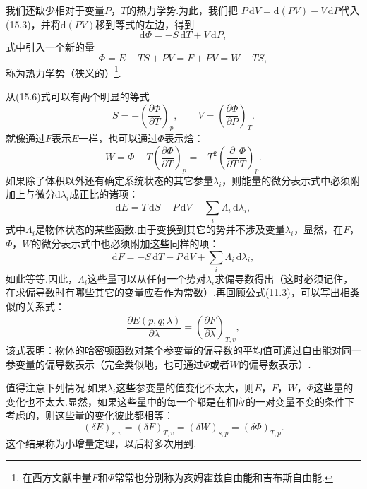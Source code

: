 我们还缺少相对于变量$P$，$T$的热力学势.为此，我们把
$P\,\mathrm{d}V=\mathrm{d}(PV)-V\,\mathrm{d}P$代入(15.3)，并将$\mathrm{d}(PV)$移到等式的左边，得到
\begin{equation}
  \mathrm{d}\varPhi=-S\,\mathrm{d}T+V\,\mathrm{d}P,
\end{equation}
式中引入一个新的量
\begin{equation}
  \varPhi=E-TS+PV=F+PV=W-TS,
\end{equation}
称为热力学势（狭义的）\footnote{在西方文献中量$F$和$\varPhi$常常也分别称为亥姆霍兹自由能和吉布斯自由能.}.

从(15.6)式可以有两个明显的等式
\begin{equation}
  S=-\left(\frac{\partial\varPhi}{\partial T}\right)_p,\qquad
  V=\left(\frac{\partial\varPhi}{\partial P}\right)_T.
\end{equation}
就像通过$F$表示$E$一样，也可以通过$\varPhi$表示焓：
\begin{equation}
  W=\varPhi-T\left(\frac{\partial\varPhi}{\partial T}\right)_p
  =-T^2\left(\frac{\partial}{\partial T}\frac{\varPhi}{T}\right)_p.
\end{equation}
如果除了体积以外还有确定系统状态的其它参量$\lambda_i$，则能量的微分表示式中必须附加上与微分$\mathrm{d}\lambda_i$成正比的诸项：
\begin{equation}
  \mathrm{d}E=T\,\mathrm{d}S-P\,\mathrm{d}V
  +\sum_i\varLambda_i\,\mathrm{d}\lambda_i,
\end{equation}
式中$\varLambda_i$是物体状态的某些函数.由于变换到其它的势并不涉及变量$\lambda_i$，显然，在$F$，$\varPhi$，$W$的微分表示式中也必须附加这些同样的项：
\begin{equation*}
  \mathrm{d}F=-S\,\mathrm{d}T-P\,\mathrm{d}V
  +\sum_i\varLambda_i\,\mathrm{d}\lambda_i,
\end{equation*}
如此等等.因此，$\varLambda_i$这些量可以从任何一个势对$\lambda_i$求偏导数得出（这时必须记住，在求偏导数时有哪些其它的变量应看作为常数）.再回顾公式(11.3)，可以写出相类似的关系式：
\begin{equation}
  \overline{\frac{\partial E(p,q;\lambda)}{\partial\lambda}}
  =\left(\frac{\partial F}{\partial\lambda}\right)_{T,v},
\end{equation}
该式表明：物体的哈密顿函数对某个参变量的偏导数的平均值可通过自由能对同一参变量的偏导数表示（完全类似地，也可通过$\varPhi$或者$W$的偏导数表示）.

值得注意下列情况.如果$\lambda_i$这些参变量的值变化不太大，则$E$，$F$，$W$，$\varPhi$这些量的变化也不太大.显然，如果这些量中的每一个都是在相应的一对变量不变的条件下考虑的，则这些量的变化彼此都相等：
\begin{equation}
  (\delta E)_{s,v}=(\delta F)_{T,v}
  =(\delta W)_{s,p}=(\delta\varPhi)_{T,p}.
\end{equation}
这个结果称为小增量定理，以后将多次用到.

